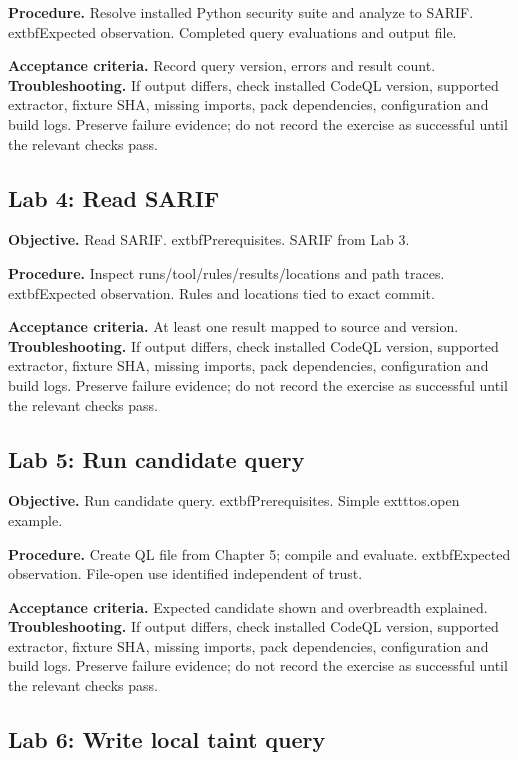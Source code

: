 \documentclass[11pt,letterpaper,oneside]{book}
\begin{document}
\textbf{Procedure.} Resolve installed Python security suite and analyze to SARIF. 	extbf{Expected observation.} Completed query evaluations and output file.

\textbf{Acceptance criteria.} Record query version, errors and result count. \textbf{Troubleshooting.} If output differs, check installed CodeQL version, supported extractor, fixture SHA, missing imports, pack dependencies, configuration and build logs. Preserve failure evidence; do not record the exercise as successful until the relevant checks pass.

\subsection{Lab 4: Read SARIF}

\textbf{Objective.} Read SARIF. 	extbf{Prerequisites.} SARIF from Lab 3.

\textbf{Procedure.} Inspect runs/tool/rules/results/locations and path traces. 	extbf{Expected observation.} Rules and locations tied to exact commit.

\textbf{Acceptance criteria.} At least one result mapped to source and version. \textbf{Troubleshooting.} If output differs, check installed CodeQL version, supported extractor, fixture SHA, missing imports, pack dependencies, configuration and build logs. Preserve failure evidence; do not record the exercise as successful until the relevant checks pass.

\subsection{Lab 5: Run candidate query}

\textbf{Objective.} Run candidate query. 	extbf{Prerequisites.} Simple 	exttt{os.open} example.

\textbf{Procedure.} Create QL file from Chapter 5; compile and evaluate. 	extbf{Expected observation.} File-open use identified independent of trust.

\textbf{Acceptance criteria.} Expected candidate shown and overbreadth explained. \textbf{Troubleshooting.} If output differs, check installed CodeQL version, supported extractor, fixture SHA, missing imports, pack dependencies, configuration and build logs. Preserve failure evidence; do not record the exercise as successful until the relevant checks pass.

\subsection{Lab 6: Write local taint query}
\end{document}
